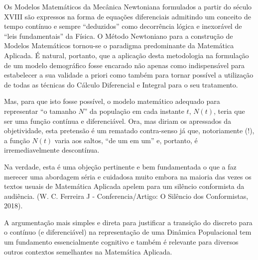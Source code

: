     Os Modelos Matemáticos da Mecânica Newtoniana formulados a partir do século XVIII são expressos na forma de equações diferenciais admitindo um conceito de tempo contínuo e sempre ``deduzidos'' como decorrência lógica e inexorável de ``leis fundamentais'' da Física. O Método Newtoniano para a construção de Modelos Matemáticos tornou-se o paradigma predominante da Matemática Aplicada. É natural, portanto, que a aplicação desta metodologia na formulação de um modelo demográfico fosse encarado não apenas como indispensável para estabelecer a sua validade a priori como também para tornar possível a utilização de todas as técnicas do Cálculo Diferencial e Integral para o seu tratamento.

    Mas, para que isto fosse possível, o modelo matemático adequado para representar ``o tamanho \(N\)'' da população em cada instante \(t\), \(N(t)\), teria que ser uma função contínua e diferenciável. Ora, mas diriam os apressados da objetividade, esta pretensão é um rematado contra-senso já que, notoriamente (!), a função \(N(t)\) varia aos saltos, ``de um em um'' e, portanto, é irremediavelmente descontínua.

    Na verdade, esta é uma objeção pertinente e bem fundamentada o que a faz merecer uma abordagem séria e cuidadosa muito embora na maioria das vezes os textos usuais de Matemática Aplicada apelem para um silêncio conformista da audiência. (W. C. Ferreira J - Conferencia/Artigo: O Silêncio dos Conformistas, 2018).

    A argumentação mais simples e direta para justificar a transição do discreto para o contínuo (e diferenciável) na representação de uma Dinâmica Populacional tem um fundamento essencialmente cognitivo e também é relevante para diversos outros contextos semelhantes na Matemática Aplicada.


